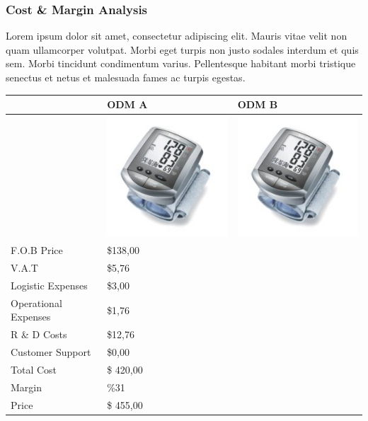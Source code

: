 \documentclass[11pt,titlepage]{article}
\begin{document}
\subsubsection{Cost \& Margin Analysis}
Lorem ipsum dolor sit amet, consectetur adipiscing elit. Mauris vitae velit 
non quam ullamcorper volutpat. Morbi eget turpis non justo sodales interdum 
et quis sem. Morbi tincidunt condimentum varius. Pellentesque habitant morbi 
tristique senectus et netus et malesuada fames ac turpis egestas.\newline
\begin{tabular}{ | l | l | l | }\hline
  & ODM A & ODM B\\\hline
  & \includegraphics[scale=0.40,bb=0 0 150 150]{prod_bpm4.jpg} & 
  \includegraphics[scale=0.40,bb=0 0 150 150]{prod_bpm4.jpg} \\\hline
  F.O.B Price & \$138,00 &\\\hline
  V.A.T & \$5,76 &\\\hline
  Logistic Expenses & \$3,00 &\\\hline
  Operational Expenses & \$1,76 &\\\hline
  R \& D Costs & \$12,76 &\\\hline
  Customer Support & \$0,00 &\\\hline
  Total Cost & \$ 420,00 &\\\hline
  Margin & \%31 &\\\hline
  Price & \$ 455,00 &\\\hline
\end{tabular}
\pagebreak
\end{document}
